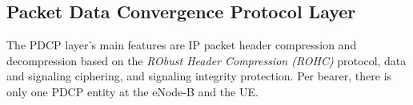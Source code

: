 \subsection{Packet Data Convergence Protocol Layer}


The PDCP layer's main features are IP packet header compression and decompression 
based on the \textit{RObust Header Compression (ROHC)} protocol, data and signaling ciphering, 
and signaling integrity protection. Per bearer, there is only one PDCP entity at the 
eNode-B and the UE.









